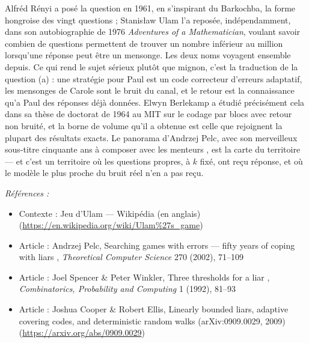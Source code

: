 \documentclass[11pt]{article}
\newenvironment{refs}{\par\small\noindent\emph{Références :}\begin{itemize}\setlength\itemsep{0pt}}{\end{itemize}\normalsize}
\begin{document}
\noindent Alfréd Rényi a posé la question en 1961, en s'inspirant du Barkochba, la
forme hongroise des vingt questions ; Stanis\l{}aw Ulam l'a reposée, indépendamment, dans son
autobiographie de 1976 \textit{Adventures of a Mathematician}, voulant savoir combien de
questions permettent de trouver un nombre inférieur au million lorsqu'une réponse peut être un
mensonge. Les deux noms voyagent ensemble depuis. Ce qui rend le sujet sérieux plutôt que
mignon, c'est la traduction de la question (a) : une stratégie pour Paul est un code
correcteur d'erreurs adaptatif, les mensonges de Carole sont le bruit du canal, et le retour
est la connaissance qu'a Paul des réponses déjà données. Elwyn Berlekamp a étudié précisément
cela dans sa thèse de doctorat de 1964 au MIT sur le codage par blocs avec retour non bruité,
et la borne de volume qu'il a obtenue est celle que rejoignent la plupart des résultats
exacts. Le panorama d'Andrzej Pelc, avec son merveilleux sous-titre \og{} cinquante ans à
composer avec les menteurs \fg{}, est la carte du territoire --- et c'est un territoire où les
questions propres, à $ k $ fixé, ont reçu réponse, et où le modèle le plus proche du bruit
réel n'en a pas reçu.

\begin{refs}
\item Contexte : Jeu d'Ulam --- Wikipédia (en anglais) (\url{https://en.wikipedia.org/wiki/Ulam%27s_game})
\item Article : Andrzej Pelc, \og{} Searching games with errors --- fifty years of coping with liars \fg{}, \textit{Theoretical Computer Science} 270 (2002), 71--109
\item Article : Joel Spencer \& Peter Winkler, \og{} Three thresholds for a liar \fg{}, \textit{Combinatorics, Probability and Computing} 1 (1992), 81--93
\item Article : Joshua Cooper \& Robert Ellis, \og{} Linearly bounded liars, adaptive covering codes, and deterministic random walks \fg{} (arXiv:0909.0029, 2009) (\url{https://arxiv.org/abs/0909.0029})
\end{refs}

\bigskip
\end{document}
